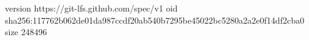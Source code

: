 version https://git-lfs.github.com/spec/v1
oid sha256:117762b062de01da987ccdf20ab540b7295be45022bc5280a2a2e0f14df2cba0
size 248496
